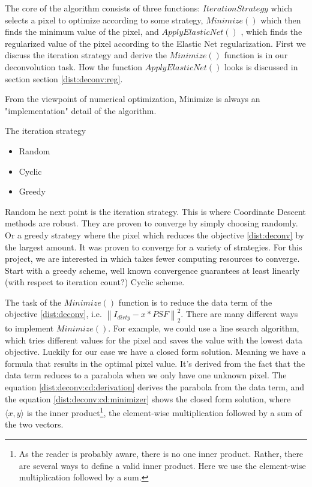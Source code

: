 The core of the algorithm consists of three functions: $IterationStrategy$ which selects a pixel to optimize according to some strategy, $Minimize()$ which then finds the minimum value of the pixel, and $ApplyElasticNet()$ , which finds the regularized value of the pixel according to the Elastic Net regularization. First we discuss the iteration strategy and derive the  $Minimize()$ function is in our deconvolution task. How the function $ApplyElasticNet()$ looks is discussed in section section \ref{dist:deconv:reg}.

From the viewpoint of numerical optimization, Minimize is always an "implementation" detail of the algorithm.

The iteration strategy
\begin{itemize}
	\item Random
	\item Cyclic
	\item Greedy
\end{itemize}
Random 
he next point is the iteration strategy. This is where Coordinate Descent methods are robust. They are proven to converge by simply choosing randomly. Or a greedy strategy where the pixel which reduces the objective \eqref{dist:deconv} by the largest amount. It was proven to converge for a variety of strategies. For this project, we are interested in which takes fewer computing resources to converge. 
Start with a greedy scheme, well known convergence guarantees at least linearly (with respect to iteration count?)\cite{luo1992convergence}
Cyclic scheme.

The task of the $Minimize()$ function is to reduce the data term of the objective \eqref{dist:deconv}, i.e. $\left \| I_{dirty} - x * PSF \right \|_2^2$. There are many different ways to implement $Minimize()$. For example,  we could use a line search algorithm, which tries different values for the pixel and saves the value with the lowest data objective. Luckily for our case we have a closed form solution. Meaning we have a formula that results in the optimal pixel value. It's derived from the fact that the data term reduces to a parabola when we only have one unknown pixel. The equation \eqref{dist:deconv:cd:derivation} derives the parabola from the data term, and the equation \eqref{dist:deconv:cd:minimizer} shows the closed form solution, where $\langle x, y\rangle$ is the inner product\footnote{As the reader is probably aware, there is no one inner product. Rather, there are several ways to define a valid inner product. Here we use the element-wise multiplication followed by a sum.}, the element-wise multiplication followed by a sum of the two vectors.

